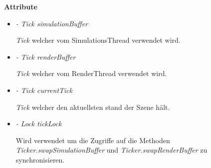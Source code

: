        \textbf{Attribute}
        \begin{itemize}
            \item \textit{- Tick simulationBuffer}
                \begin{leftbar}[0.9\linewidth]
                    \textit{Tick} welcher vom SimulationsThread verwendet wird.
                \end{leftbar}
            \item \textit{- Tick renderBuffer}
                \begin{leftbar}[0.9\linewidth]
                    \textit{Tick} welcher vom RenderThread verwendet wird.
                \end{leftbar}
            \item \textit{- Tick currentTick}
                \begin{leftbar}[0.9\linewidth]
                    \textit{Tick} welcher den aktuellsten stand der Szene hält.
                \end{leftbar}
            \item \textit{- Lock tickLock}
                \begin{leftbar}[0.9\linewidth]
                    Wird verwendet um die Zugriffe auf die Methoden \textit{Ticker.swapSimulationBuffer} und \textit{Ticker.swapRenderBuffer}
                    zu synchronisieren.
                \end{leftbar}
        \end{itemize}

